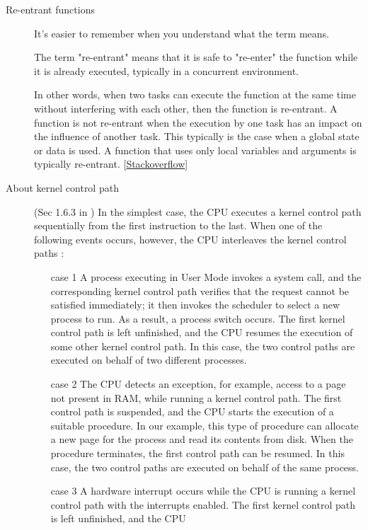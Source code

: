 \begin{description}
\item[Re-entrant functions] It's easier to remember when you understand what the term
  means.

  The term "re-entrant" means that it is safe to "re-enter" the function while it is
  already executed, typically in a concurrent environment.

  In other words, when two tasks can execute the function at the same time without
  interfering with each other, then the function is re-entrant. A function is not
  re-entrant when the execution by one task has an impact on the influence of another
  task. This typically is the case when a global state or data is used. A function that
  uses only local variables and arguments is typically
  re-entrant. [\href{http://stackoverflow.com/questions/261311/what-is-the-difference-between-re-entrant-function-and-recursive-function-in-c}{Stackoverflow}]
\item[About kernel control path] (Sec 1.6.3 in \cite{bovet2005understanding}) In the
  simplest case, the CPU executes a kernel control path sequentially from the first
  instruction to the last. When one of the following events occurs, however, the CPU
  interleaves the kernel control paths :
  \begin{itemize}
  \item[case 1] A process executing in User Mode invokes a system call, and the corresponding
    kernel control path verifies that the request cannot be satisfied immediately; it then
    invokes the scheduler to select a new process to run. As a result, a process switch
    occurs. The first kernel control path is left unfinished, and the CPU resumes the
    execution of some other kernel control path. In this case, the two control paths are
    executed on behalf of two different processes.
  \item[case 2] The CPU detects an exception, for example, access to a page not present in
    RAM, while running a kernel control path. The first control path is suspended, and the
    CPU starts the execution of a suitable procedure. In our example, this type of
    procedure can allocate a new page for the process and read its contents from
    disk. When the procedure terminates, the first control path can be resumed. In this
    case, the two control paths are executed on behalf of the same process.
  \item[case 3] A hardware interrupt occurs while the CPU is running a kernel control path with
    the interrupts enabled. The first kernel control path is left unfinished, and the CPU

\end{itemize}
\end{description}
